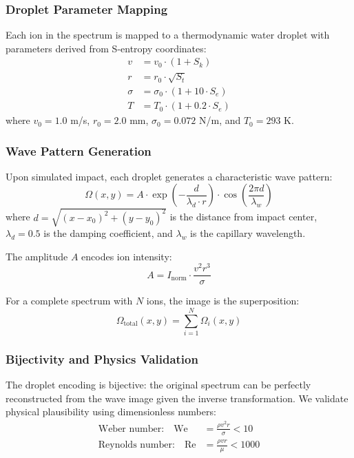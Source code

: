 \documentclass[twocolumn,10pt]{article}
\begin{document}
\subsubsection{Droplet Parameter Mapping}

Each ion in the spectrum is mapped to a thermodynamic water droplet with parameters derived from S-entropy coordinates:
\begin{align}
v &= v_0 \cdot (1 + S_k) \label{eq:droplet_velocity} \\
r &= r_0 \cdot \sqrt{S_t} \label{eq:droplet_radius} \\
\sigma &= \sigma_0 \cdot (1 + 10 \cdot S_e) \label{eq:droplet_tension} \\
T &= T_0 \cdot (1 + 0.2 \cdot S_e) \label{eq:droplet_temp}
\end{align}
where $v_0 = 1.0$ m/s, $r_0 = 2.0$ mm, $\sigma_0 = 0.072$ N/m, and $T_0 = 293$ K.

\subsubsection{Wave Pattern Generation}

Upon simulated impact, each droplet generates a characteristic wave pattern:
\begin{equation}
\Omega(x, y) = A \cdot \exp\left(-\frac{d}{\lambda_d \cdot r}\right) \cdot \cos\left(\frac{2\pi d}{\lambda_w}\right)
\end{equation}
where $d = \sqrt{(x-x_0)^2 + (y-y_0)^2}$ is the distance from impact center, $\lambda_d = 0.5$ is the damping coefficient, and $\lambda_w$ is the capillary wavelength.

The amplitude $A$ encodes ion intensity:
\begin{equation}
A = I_{\text{norm}} \cdot \frac{v^2 r^3}{\sigma}
\end{equation}

For a complete spectrum with $N$ ions, the image is the superposition:
\begin{equation}
\Omega_{\text{total}}(x, y) = \sum_{i=1}^{N} \Omega_i(x, y)
\end{equation}

\subsubsection{Bijectivity and Physics Validation}

The droplet encoding is bijective: the original spectrum can be perfectly reconstructed from the wave image given the inverse transformation. We validate physical plausibility using dimensionless numbers:
\begin{align}
\text{Weber number:} \quad \text{We} &= \frac{\rho v^2 r}{\sigma} < 10 \\
\text{Reynolds number:} \quad \text{Re} &= \frac{\rho v r}{\mu} < 1000
\end{align}
\end{document}
